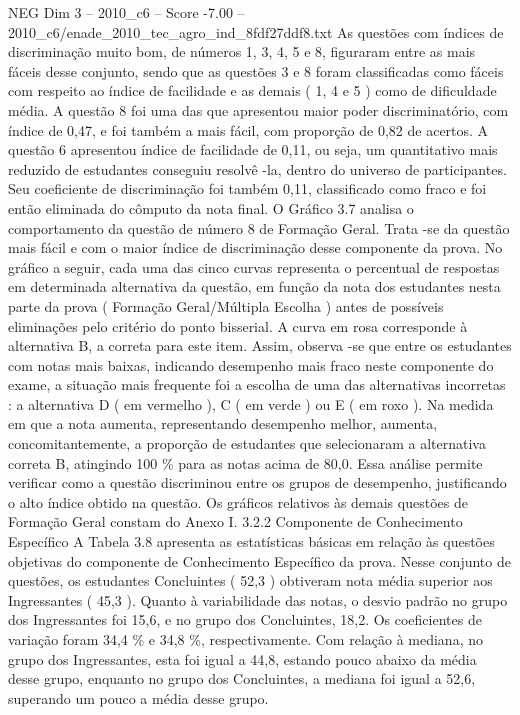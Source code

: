 \begin{textsample}{NEG Dim 3 – 2010\_c6 – Score -7.00 – 2010\_c6/enade\_2010\_tec\_agro\_ind\_8fdf27ddf8.txt}
As questões com índices de discriminação muito bom, de números 1, 3, 4, 5 e 8, figuraram entre as mais fáceis desse conjunto, sendo que as questões 3 e 8 foram classificadas como fáceis com respeito ao índice de facilidade e as demais ( 1, 4 e 5 ) como de dificuldade média.
A questão 8 foi uma das que apresentou maior poder discriminatório, com índice de 0,47, e foi também a mais fácil, com proporção de 0,82 de acertos.
A questão 6 apresentou índice de facilidade de 0,11, ou seja, um quantitativo mais reduzido de estudantes conseguiu resolvê -la, dentro do universo de participantes.
Seu coeficiente de discriminação foi também 0,11, classificado como fraco e foi então eliminada do cômputo da nota final.
O Gráfico 3.7 analisa o comportamento da questão de número 8 de Formação Geral.
Trata -se da questão mais fácil e com o maior índice de discriminação desse componente da prova.
No gráfico a seguir, cada uma das cinco curvas representa o percentual de respostas em determinada alternativa da questão, em função da nota dos estudantes nesta parte da prova ( Formação Geral/Múltipla Escolha ) antes de possíveis eliminações pelo critério do ponto bisserial.
A curva em rosa corresponde à alternativa B, a correta para este item.
Assim, observa -se que entre os estudantes com notas mais baixas, indicando desempenho mais fraco neste componente do exame, a situação mais frequente foi a escolha de uma das alternativas incorretas : a alternativa D ( em vermelho ), C ( em verde ) ou E ( em roxo ).
Na medida em que a nota aumenta, representando desempenho melhor, aumenta, concomitantemente, a proporção de estudantes que selecionaram a alternativa correta B, atingindo 100 \% para as notas acima de 80,0.
Essa análise permite verificar como a questão discriminou entre os grupos de desempenho, justificando o alto índice obtido na questão.
Os gráficos relativos às demais questões de Formação Geral constam do Anexo I. 3.2.2 Componente de Conhecimento Específico A Tabela 3.8 apresenta as estatísticas básicas em relação às questões objetivas do componente de Conhecimento Específico da prova.
Nesse conjunto de questões, os estudantes Concluintes ( 52,3 ) obtiveram nota média superior aos Ingressantes ( 45,3 ).
Quanto à variabilidade das notas, o desvio padrão no grupo dos Ingressantes foi 15,6, e no grupo dos Concluintes, 18,2.
Os coeficientes de variação foram 34,4 \% e 34,8 \%, respectivamente.
Com relação à mediana, no grupo dos Ingressantes, esta foi igual a 44,8, estando pouco abaixo da média desse grupo, enquanto no grupo dos Concluintes, a mediana foi igual a 52,6, superando um pouco a média desse grupo.

\end{textsample}
